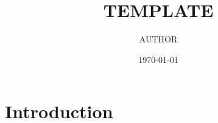 \documentclass[11pt]{article}
\author{AUTHOR}
\title{TEMPLATE}
\date{\specialdate\today}
\begin{document}
    \maketitle

    \section{Introduction}
    

    
    
\end{document}
